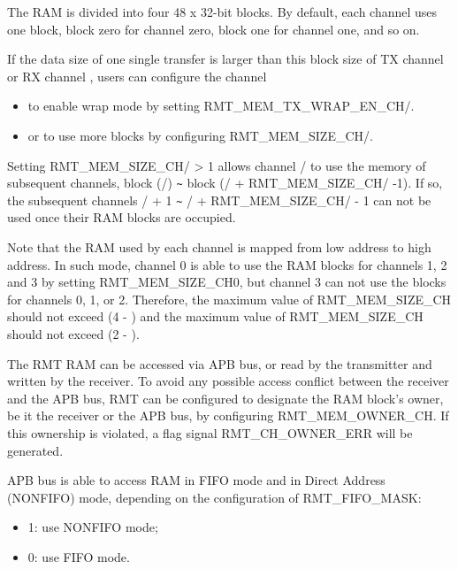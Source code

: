 \documentclass[main\_\_EN.tex]{subfiles}
\begin{document}
The RAM is divided into four 48 x 32-bit blocks. By default, each channel uses one block, block zero for channel zero, block one for channel one, and so on. 

If the data size of one single transfer is larger than this block size of TX channel  or RX channel , users can configure the channel 
\begin{itemize}
    \item to enable wrap mode by setting RMT\_MEM\_TX\_WRAP\_EN\_CH/.
    \item or to use more blocks by configuring RMT\_MEM\_SIZE\_CH/.
\end{itemize}
Setting RMT\_MEM\_SIZE\_CH/ > 1 allows channel / to use the memory of subsequent channels, block (/) \verb+~+ block (/ + RMT\_MEM\_SIZE\_CH/ -1). If so, the subsequent channels  / + 1 \verb+~+ / + RMT\_MEM\_SIZE\_CH/ - 1 can not be used once their RAM blocks are occupied. 

Note that the RAM used by each channel is mapped from low address to high address. In such mode, channel 0 is able to use the RAM blocks for channels 1, 2 and 3 by setting RMT\_MEM\_SIZE\_CH0, but channel 3 can not use the blocks for channels 0, 1, or 2. Therefore, the maximum value of RMT\_MEM\_SIZE\_CH should not exceed (4 - ) and the maximum value of RMT\_MEM\_SIZE\_CH should not exceed (2 - ).

The RMT RAM can be accessed via APB bus, or read by the transmitter and written by the receiver. To avoid any possible access conflict between the receiver and the APB bus, RMT can be configured to designate the RAM block's owner, be it the receiver or the APB bus, by configuring RMT\_MEM\_OWNER\_CH. If this ownership is violated, a flag signal RMT\_CH\_OWNER\_ERR will be generated. 

APB bus is able to access RAM in FIFO mode and in Direct Address (NONFIFO) mode, depending on the configuration of RMT\_FIFO\_MASK:
\begin{itemize}
    \item 1: use NONFIFO mode;
    \item 0: use FIFO mode. 
\end{itemize}
\end{document}
